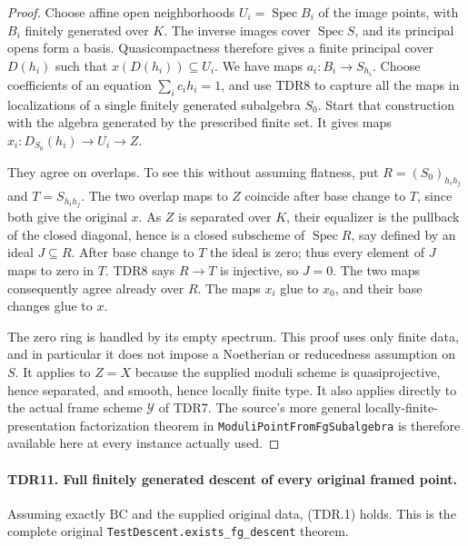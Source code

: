 \documentclass[11pt,a4paper]{article}
\numberwithin{equation}{section}
\theoremstyle{remark}\newtheorem{remark}[theorem]{Remark}
\begin{document}
\begin{proof}
Choose affine open neighborhoods \(U_i=\operatorname{Spec}B_i\)
of the image points, with \(B_i\) finitely generated over \(K\).
The inverse images cover \(\operatorname{Spec}S\), and its
principal opens form a basis.  Quasicompactness therefore gives
a finite principal cover \(D(h_i)\) such that
\(x(D(h_i))\subseteq U_i\).  We have maps
\(a_i:B_i\to S_{h_i}\).  Choose coefficients of an equation
\(\sum_i c_i h_i=1\), and use TDR8 to capture all the maps
in localizations of a single finitely generated subalgebra \(S_0\).
Start that construction with the algebra generated by the
prescribed finite set.  It gives maps
\(x_i:D_{S_0}(h_i)\to U_i\to Z\).

They agree on overlaps.  To see this without assuming flatness,
put \(R=(S_0)_{h_i h_j}\) and \(T=S_{h_i h_j}\).
The two overlap maps to \(Z\) coincide after base change to
\(T\), since both give the original \(x\).
As \(Z\) is separated over \(K\), their equalizer is the
pullback of the closed diagonal, hence is a closed subscheme of
\(\operatorname{Spec}R\), say defined by an ideal \(J\subseteq R\).
After base change to \(T\) the ideal is zero; thus every element
of \(J\) maps to zero in \(T\).  TDR8 says \(R\to T\)
is injective, so \(J=0\).  The two maps consequently agree
already over \(R\).  The maps \(x_i\) glue to \(x_0\),
and their base changes glue to \(x\).

The zero ring is handled by its empty spectrum.  This proof uses
only finite data, and in particular it does not impose a
Noetherian or reducedness assumption on \(S\).  It applies to
\(Z=X\) because the supplied moduli scheme is quasiprojective,
hence separated, and smooth, hence locally finite type.
It also applies directly to the actual frame scheme \(\mathcal Y\)
of TDR7.  The source's more general locally-finite-presentation
factorization theorem in \texttt{Moduli\allowbreak Point\allowbreak From\allowbreak Fg\allowbreak Subalgebra}
is therefore available here at every instance actually used.
\end{proof}

\paragraph{TDR11. Full finitely generated descent of every original framed point.}
\label{claim:TDR11}
Assuming exactly \(\mathrm{BC}\) and the supplied original data,
(TDR.1) holds.  This is the complete original
\texttt{Test\allowbreak Descent.\allowbreak exists\_\allowbreak fg\_\allowbreak descent} theorem.
\end{document}
